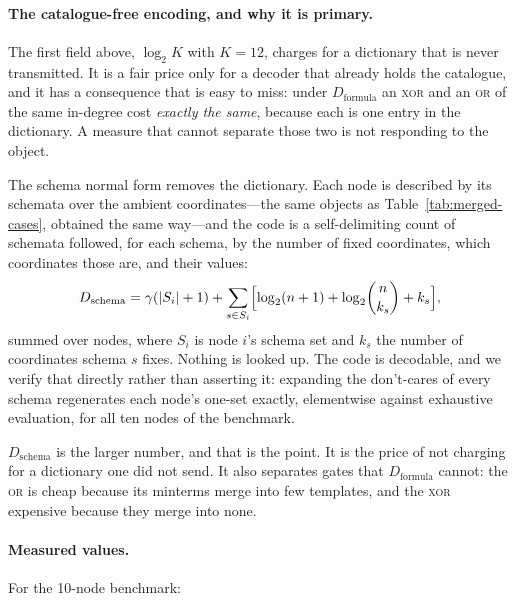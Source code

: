 \documentclass[11pt]{article}
\begin{document}
\paragraph{The catalogue-free encoding, and why it is primary.}
The first field above, $\log_2 K$ with $K=12$, charges for a dictionary that is
never transmitted.  It is a fair price only for a decoder that already holds the
catalogue, and it has a consequence that is easy to miss: under
$D_{\mathrm{formula}}$ an \textsc{xor} and an \textsc{or} of the same in-degree
cost \emph{exactly the same}, because each is one entry in the dictionary.  A
measure that cannot separate those two is not responding to the object.

The schema normal form removes the dictionary.  Each node is described by its
schemata over the ambient coordinates---the same objects as
Table~\ref{tab:merged-cases}, obtained the same way---and the code is a
self-delimiting count of schemata followed, for each schema, by the number of
fixed coordinates, which coordinates those are, and their values:
\[
D_{\mathrm{schema}}
= \gamma(|S_i|+1)
+ \sum_{s\in S_i}\Bigl[\log_2(n+1) + \log_2\!\binom{n}{k_s} + k_s\Bigr],
\]
summed over nodes, where $S_i$ is node $i$'s schema set and $k_s$ the number of
coordinates schema $s$ fixes.  Nothing is looked up.  The code is decodable, and
we verify that directly rather than asserting it: expanding the don't-cares of
every schema regenerates each node's one-set exactly, elementwise against
exhaustive evaluation, for all ten nodes of the benchmark.

$D_{\mathrm{schema}}$ is the larger number, and that is the point.  It is the
price of not charging for a dictionary one did not send.  It also separates
gates that $D_{\mathrm{formula}}$ cannot: the \textsc{or} is cheap because its
minterms merge into few templates, and the \textsc{xor} expensive because they
merge into none.

\paragraph{Measured values.}
For the 10-node benchmark:
\end{document}
